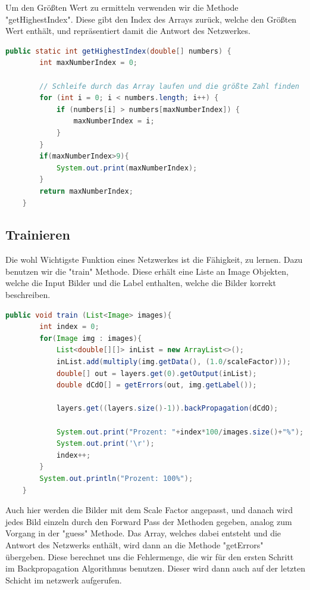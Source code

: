 \documentclass[12pt]{article}
\begin{document}
Um den Größten Wert zu ermitteln verwenden wir die Methode "getHighestIndex". Diese gibt den Index des Arrays zurück, welche den Größten Wert enthält, und repräsentiert damit die Antwort des Netzwerkes.
\begin{lstlisting}[language=Java]
    public static int getHighestIndex(double[] numbers) {
        int maxNumberIndex = 0;

        // Schleife durch das Array laufen und die größte Zahl finden
        for (int i = 0; i < numbers.length; i++) {
            if (numbers[i] > numbers[maxNumberIndex]) {
                maxNumberIndex = i;
            }
        }
        if(maxNumberIndex>9){
            System.out.print(maxNumberIndex);
        }
        return maxNumberIndex;
    }
\end{lstlisting}

\subsection{Trainieren}

Die wohl Wichtigste Funktion eines Netzwerkes ist die Fähigkeit, zu lernen. Dazu benutzen wir die "train" Methode. Diese erhält eine Liste an Image Objekten, welche die Input Bilder und die Label enthalten, welche die Bilder korrekt beschreiben.
\begin{lstlisting}[language=Java]
public void train (List<Image> images){
        int index = 0;
        for(Image img : images){
            List<double[][]> inList = new ArrayList<>();
            inList.add(multiply(img.getData(), (1.0/scaleFactor)));
            double[] out = layers.get(0).getOutput(inList);
            double dCdO[] = getErrors(out, img.getLabel());

            layers.get((layers.size()-1)).backPropagation(dCdO);

            System.out.print("Prozent: "+index*100/images.size()+"%");
            System.out.print('\r');
            index++;
        }
        System.out.println("Prozent: 100%");
    }
\end{lstlisting}
Auch hier werden die Bilder mit dem Scale Factor angepasst, und danach wird jedes Bild einzeln durch den Forward Pass der Methoden gegeben, analog zum Vorgang in der "guess" Methode. Das Array, welches dabei entsteht und die Antwort des Netzwerks enthält, wird dann an die Methode "getErrors" übergeben. Diese berechnet uns die Fehlermenge, die wir für den ersten Schritt im Backpropagation Algorithmus benutzen. Dieser wird dann auch auf der letzten Schicht im netzwerk aufgerufen.
\end{document}
